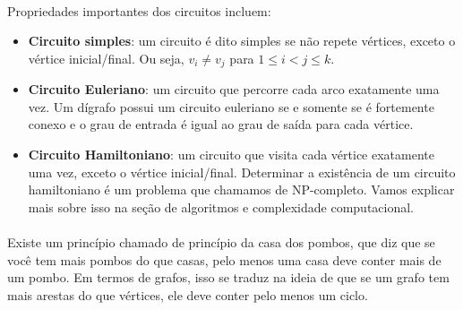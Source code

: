\documentclass[12pt,a4paper]{article}
\begin{document}
\begin{center}
\label{fig:ciclo-direcionado}
\end{center}

\paragraph{}
Propriedades importantes dos circuitos incluem:
\begin{itemize}
    \item \textbf{Circuito simples}: um circuito é dito simples se não repete vértices, exceto o vértice inicial/final. Ou seja, \(v_i \neq v_j\) para \(1 \leq i < j \leq k\).
    \item \textbf{Circuito Euleriano}: um circuito que percorre cada arco exatamente uma vez. Um dígrafo possui um circuito euleriano se e somente se é fortemente conexo e o grau de entrada é igual ao grau de saída para cada vértice.
    \item \textbf{Circuito Hamiltoniano}: um circuito que visita cada vértice exatamente uma vez, exceto o vértice inicial/final. Determinar a existência de um circuito hamiltoniano é um problema que chamamos de NP-completo. Vamos explicar mais sobre isso na seção de algoritmos e complexidade computacional.
\end{itemize}       

\paragraph{}
Existe um princípio chamado de princípio da casa dos pombos, que diz que se você tem mais pombos do que casas, pelo menos uma casa deve conter mais de um pombo. Em termos de grafos, isso se traduz na ideia de que se um grafo tem mais arestas do que vértices, ele deve conter pelo menos um ciclo.
\end{document}
